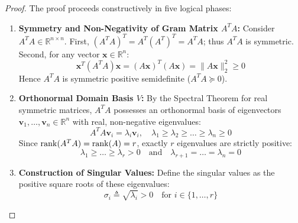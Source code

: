 \begin{proof}
The proof proceeds constructively in five logical phases:
\begin{enumerate}
    \item \textbf{Symmetry and Non-Negativity of Gram Matrix $A^T A$:}
    Consider $A^T A \in \mathbb{R}^{n \times n}$. First, $(A^T A)^T = A^T (A^T)^T = A^T A$; thus $A^T A$ is symmetric.
    Second, for any vector $\mathbf{x} \in \mathbb{R}^n$:
    \begin{equation}
    \mathbf{x}^T (A^T A)\mathbf{x} = (A\mathbf{x})^T (A\mathbf{x}) = \|A\mathbf{x}\|_2^2 \ge 0
    \end{equation}
    Hence $A^T A$ is symmetric positive semidefinite ($A^T A \succeq 0$).

    \item \textbf{Orthonormal Domain Basis $V$:}
    By the Spectral Theorem for real symmetric matrices, $A^T A$ possesses an orthonormal basis of eigenvectors $\mathbf{v}_1, \dots, \mathbf{v}_n \in \mathbb{R}^n$ with real, non-negative eigenvalues:
    \begin{equation}
    A^T A \mathbf{v}_i = \lambda_i \mathbf{v}_i, \quad \lambda_1 \ge \lambda_2 \ge \dots \ge \lambda_n \ge 0
    \end{equation}
    Since $\operatorname{rank}(A^T A) = \operatorname{rank}(A) = r$, exactly $r$ eigenvalues are strictly positive:
    \begin{equation}
    \lambda_1 \ge \dots \ge \lambda_r > 0 \quad \text{and} \quad \lambda_{r+1} = \dots = \lambda_n = 0
    \end{equation}

    \item \textbf{Construction of Singular Values:}
    Define the singular values as the positive square roots of these eigenvalues:
    \begin{equation}
    \sigma_i \triangleq \sqrt{\lambda_i} > 0 \quad \text{for } i \in \{1, \dots, r\}
    \end{equation}


\end{enumerate}
\end{proof}
